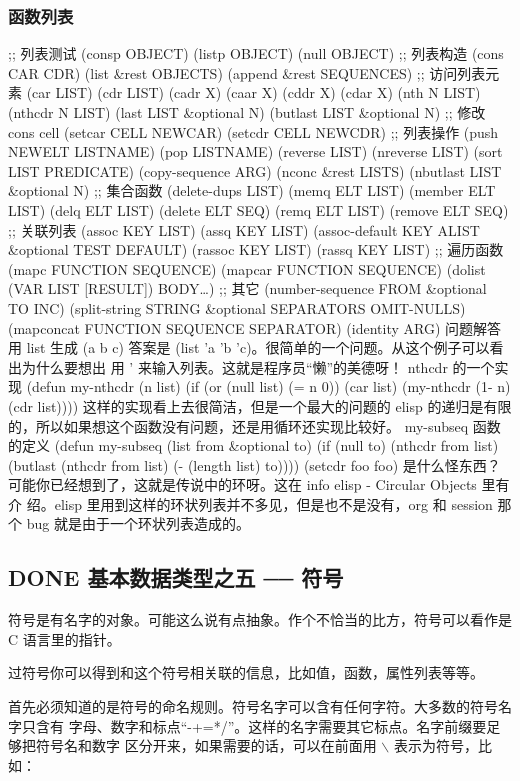 \documentclass[11pt]{ctexart}
\begin{document}
\subsubsection{函数列表}
\label{sec:org0796677}
;; 列表测试
(consp OBJECT)
(listp OBJECT)
(null OBJECT)
;; 列表构造
(cons CAR CDR)
(list \&rest OBJECTS)
(append \&rest SEQUENCES)
;; 访问列表元素
(car LIST)
(cdr LIST)
(cadr X)
(caar X)
(cddr X)
(cdar X)
(nth N LIST)
(nthcdr N LIST)
(last LIST \&optional N)
(butlast LIST \&optional N)
;; 修改 cons cell
(setcar CELL NEWCAR)
(setcdr CELL NEWCDR)
;; 列表操作
(push NEWELT LISTNAME)
(pop LISTNAME)
(reverse LIST)
(nreverse LIST)
(sort LIST PREDICATE)
(copy-sequence ARG)
(nconc \&rest LISTS)
(nbutlast LIST \&optional N)
;; 集合函数
(delete-dups LIST)
(memq ELT LIST)
(member ELT LIST)
(delq ELT LIST)
(delete ELT SEQ)
(remq ELT LIST)
(remove ELT SEQ)
;; 关联列表
(assoc KEY LIST)
(assq KEY LIST)
(assoc-default KEY ALIST \&optional TEST DEFAULT)
(rassoc KEY LIST)
(rassq KEY LIST)
;; 遍历函数
(mapc FUNCTION SEQUENCE)
(mapcar FUNCTION SEQUENCE)
(dolist (VAR LIST [RESULT]) BODY\ldots{})
;; 其它
(number-sequence FROM \&optional TO INC)
(split-string STRING \&optional SEPARATORS OMIT-NULLS)
(mapconcat FUNCTION SEQUENCE SEPARATOR)
(identity ARG)
问题解答
用 list 生成 (a b c)
答案是 (list 'a 'b 'c)。很简单的一个问题。从这个例子可以看出为什么要想出 用 ' 来输入列表。这就是程序员“懒”的美德呀！
nthcdr 的一个实现
(defun my-nthcdr (n list)
(if (or (null list) (= n 0))
(car list)
(my-nthcdr (1- n) (cdr list))))
这样的实现看上去很简洁，但是一个最大的问题的 elisp 的递归是有限的，所以如果想这个函数没有问题，还是用循环还实现比较好。
my-subseq 函数的定义
(defun my-subseq (list from \&optional to)
(if (null to) (nthcdr from list)
(butlast (nthcdr from list) (- (length list) to))))
(setcdr foo foo) 是什么怪东西？
可能你已经想到了，这就是传说中的环呀。这在 info elisp - Circular Objects 里有介
绍。elisp 里用到这样的环状列表并不多见，但是也不是没有，org 和 session 那个 bug
就是由于一个环状列表造成的。

\subsection{{\bfseries\sffamily DONE} 基本数据类型之五 ── 符号}
\label{sec:org3f479b2}
符号是有名字的对象。可能这么说有点抽象。作个不恰当的比方，符号可以看作是 C
语言里的指针。

过符号你可以得到和这个符号相关联的信息，比如值，函数，属性列表等等。

首先必须知道的是符号的命名规则。符号名字可以含有任何字符。大多数的符号名字只含有
字母、数字和标点“-+=*/”。这样的名字需要其它标点。名字前缀要足够把符号名和数字
区分开来，如果需要的话，可以在前面用 $\backslash$ 表示为符号，比如：
\end{document}
